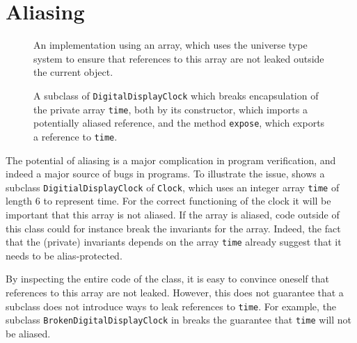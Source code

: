 \documentclass{llncs}
\begin{document}
\section{Aliasing}
\label{Sec:ownership}

\begin{figure}[tbp] \label{Example:alias}
%
%
\vspace*{-3ex} %
\caption{An implementation using an array, which uses the universe type 
system \cite{Mueller-Poetzsch-Heffter-Leavens03} to ensure that references
to this array are not leaked outside the current object.}
\end{figure}

\begin{figure}[tbp] \label{Example:brokenalias}
%
%
\vspace*{-2ex} %
\caption{A subclass of \texttt{DigitalDisplayClock} which breaks encapsulation
of the private array \texttt{time}, both by its constructor, which imports
a potentially aliased reference, and the method \texttt{expose}, which exports
a reference to \texttt{time}.}
\end{figure}

The potential of aliasing is a major complication in program verification,
and indeed a major source of bugs in programs. 
To illustrate the issue,  shows a subclass 
\texttt{DigitialDisplayClock} 
of \texttt{Clock}, which uses an integer array \texttt{time} of length 6 
to represent time.  For the correct functioning of the clock it will be 
important that this array is not aliased. If the array is aliased, code 
outside of this class could for instance break the invariants for the array.
Indeed, the fact that the (private) invariants depends on the array 
\texttt{time} already suggest that it needs to be alias-protected.

By inspecting the entire code of the class, it is easy to convince
oneself that references to this array are not leaked.
However, this does not guarantee that a subclass does not introduce
ways to leak references to \texttt{time}.
For example, the subclass \texttt{BrokenDigitalDisplayClock} in 
 breaks the guarantee that \texttt{time}
will not be aliased.
\end{document}
